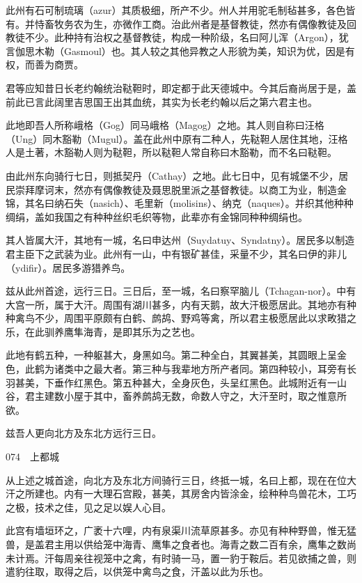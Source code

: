 \documentclass[12pt,UTF8]{ctexbook}
\begin{document}
此州有石可制琉璃（azur）其质极细，所产不少。州人并用驼毛制毡甚多，各色皆有。并恃畜牧务农为生，亦微作工商。治此州者是基督教徒，然亦有偶像教徒及回教徒不少。此种持有治权之基督教徒，构成一种阶级，名曰阿儿浑（Argon），犹言伽思木勒（Gasmoul）也。其人较之其他异教之人形貌为美，知识为优，因是有权，而善为商贾。

君等应知昔日长老约翰统治鞑靼时，即定都于此天德城中。今其后裔尚居于是，盖前此已言此阔里吉思国王出其血统，其实为长老约翰以后之第六君主也。

此地即吾人所称峨格（Gog）同马峨格（Magog）之地。其人则自称曰汪格（Ung）同木豁勒（Mugul）。盖在此州中原有二种人，先鞑靼人居住其地，汪格人是土著，木豁勒人则为鞑靼，所以鞑靼人常自称曰木豁勒，而不名曰鞑靼。

由此州东向骑行七日，则抵契丹（Cathay）之地。此七日中，见有城堡不少，居民崇拜摩诃末，然亦有偶像教徒及聂思脱里派之基督教徒。以商工为业，制造金锦，其名曰纳石失（nasich）、毛里新（molisins）、纳克（naques）。并织其他种种绸绢，盖如我国之有种种丝织毛织等物，此辈亦有金锦同种种绸绢也。

其人皆属大汗，其地有一城，名曰申达州（Suydatuy、Syndatny）。居民多以制造君主臣下之武装为业。此州有一山，中有银矿甚佳，采量不少，其名曰伊的非儿（ydifir）。居民多游猎养鸟。

兹从此州首途，远行三日。三日后，至一城，名曰察罕脑儿（Tchagan-nor）。中有大宫一所，属于大汗。周围有湖川甚多，内有天鹅，故大汗极愿居此。其地亦有种种禽鸟不少，周围平原颇有白鹤、鹧鸪、野鸡等禽，所以君主极愿居此以求畋猎之乐，在此驯养鹰隼海青，是即其乐为之艺也。

此地有鹤五种，一种躯甚大，身黑如乌。第二种全白，其翼甚美，其圆眼上呈金色，此鹤为诸类中之最大者。第三种与我辈地方所产者同。第四种较小，耳旁有长羽甚美，下垂作红黑色。第五种甚大，全身灰色，头呈红黑色。此城附近有一山谷，君主建数小屋于其中，畜养鹧鸪无数，命数人守之，大汗至时，取之惟意所欲。

兹吾人更向北方及东北方远行三日。





074　上都城

从上述之城首途，向北方及东北方间骑行三日，终抵一城，名曰上都，现在在位大汗之所建也。内有一大理石宫殿，甚美，其房舍内皆涂金，绘种种鸟兽花木，工巧之极，技术之佳，见之足以娱人心目。

此宫有墙垣环之，广袤十六哩，内有泉渠川流草原甚多。亦见有种种野兽，惟无猛兽，是盖君主用以供给笼中海青、鹰隼之食者也。海青之数二百有余，鹰隼之数尚未计焉。汗每周亲往视笼中之禽，有时骑一马，置一豹于鞍后。若见欲捕之兽，则遣豹往取，取得之后，以供笼中禽鸟之食，汗盖以此为乐也。
\end{document}
